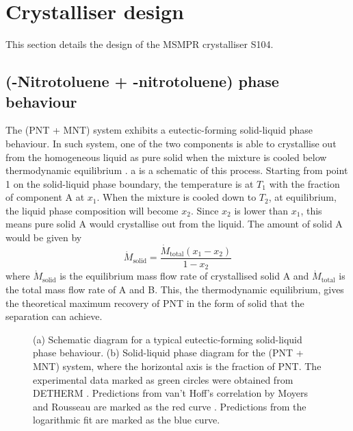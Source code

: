 \section{Crystalliser design}

This section details the design of the MSMPR crystalliser S104. 

\subsection{(\para-Nitrotoluene + \meta-nitrotoluene) phase behaviour}

The (PNT + MNT) system exhibits a eutectic-forming solid-liquid phase behaviour. In such system, one of the two components is able to crystallise out from the homogeneous liquid as pure solid when the mixture is cooled below thermodynamic equilibrium \cite{seader_separation_2011}. a is a schematic of this process. Starting from point 1 on the solid-liquid phase boundary, the temperature is at $T_1$ with the fraction of component A at $x_1$. When the mixture is cooled down to $T_2$, at equilibrium, the liquid phase composition will become $x_2$. Since $x_2$ is lower than $x_1$, this means pure solid A would crystallise out from the liquid. The amount of solid A would be given by
\begin{equation}\label{eq:amount solid A equilibrium}
    \dot{M}_{\mathrm{solid}} = \frac{\dot{M}_{\mathrm{total}} (x_1 - x_2)}{1 - x_2}
\end{equation}
where $\dot{M}_{\mathrm{solid}}$ is the equilibrium mass flow rate of crystallised solid A and $\dot{M}_{\mathrm{total}}$ is the total mass flow rate of A and B. This, the thermodynamic equilibrium, gives the theoretical maximum recovery of PNT in the form of solid that the separation can achieve.

\begin{figure}[h]
    \centering
    
    \caption{(a) Schematic diagram for a typical eutectic-forming solid-liquid phase behaviour. (b) Solid-liquid phase diagram for the (PNT + MNT) system, where the horizontal axis is the fraction of PNT. The experimental data marked as green circles were obtained from DETHERM \cite{noauthor_detherm_2021}. Predictions from van't Hoff's correlation by Moyers and Rousseau are marked as the red curve \cite{moyers_crystallization_1987}. Predictions from the logarithmic fit are marked as the blue curve.}
    \label{fig:eutectic schematic}
\end{figure}

